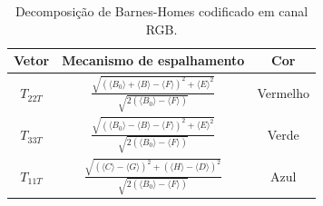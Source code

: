 \documentclass{article}
\begin{document}
\begin{table}[H]
    \centering
    \begin{tabular}{|c|c|c|}
         \hline
         Vetor & Mecanismo de espalhamento & Cor \\ \hline
         $T_{22T}$ & $\frac{\sqrt{(\langle B_{0} \rangle + \langle B \rangle - \langle F \rangle)^2 + \langle E \rangle^2}}{\sqrt{2 (\langle B_{0} \rangle - \langle F \rangle)}}$ & Vermelho \\ \hline
         
         $T_{33T}$ & $\frac{\sqrt{(\langle B_{0} \rangle - \langle B \rangle - \langle F \rangle)^2 + \langle E \rangle^2}}{\sqrt{2 (\langle B_{0} \rangle - \langle F \rangle)}}$ & Verde \\ \hline
         
         $T_{11T}$ & $\frac{\sqrt{(\langle C \rangle - \langle G \rangle)^2 + (\langle H \rangle - \langle D \rangle)^2}}{\sqrt{2 (\langle B_{0} \rangle - \langle F \rangle)}}$ & Azul \\ \hline
    \end{tabular}
    \caption{Decomposição de Barnes-Homes codificado em canal RGB.}
    \label{tab:code_color_Barnes}
\end{table}



\end{document}
